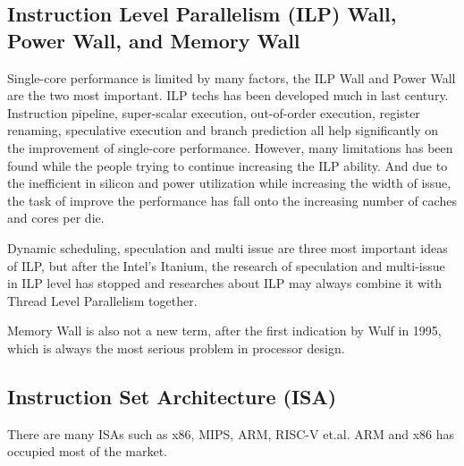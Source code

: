 \subsection{Instruction Level Parallelism (ILP) Wall, Power Wall, and Memory Wall\cite{wulf1995hitting}}
Single-core performance is limited by many factors, the ILP Wall and Power Wall are the two most important\cite{hennessy2017computer}. ILP techs has been developed much in last century. Instruction pipeline, super-scalar execution, out-of-order execution, register renaming, speculative execution and branch prediction all help significantly on the improvement of single-core performance. However, many limitations has been found while the people trying to continue increasing the ILP ability\cite{postiff1999limits}\cite{Wall1991176Limits}. And due to the inefficient in silicon and power utilization while increasing the width of issue, the task of improve the performance has fall onto the increasing number of caches and cores per die\cite{hennessy2017computer}.
\par 
Dynamic scheduling, speculation and multi issue are three most important ideas of ILP, but after the Intel's Itanium\textsuperscript{\textregistered}, the research of speculation and multi-issue in ILP level has stopped\cite{winkel2004exploring} and researches about ILP may always combine it with Thread Level Parallelism together\cite{wang2009dynamic}\cite{xekalakis2012mixed}. 
\par 
Memory Wall is also not a new term, after the first indication by Wulf in 1995\cite{wulf1995hitting}, which is always the most serious problem in processor design\cite{asanovic2006landscape}.
\subsection{Instruction Set Architecture (ISA)}
There are many ISAs such as x86, MIPS, ARM, RISC-V et.al. ARM and x86 has occupied most of the market. 

